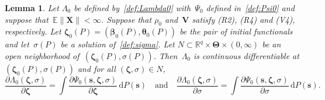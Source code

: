 \documentclass{article}
\numberwithin{equation}{section}
\theoremstyle{plain}
\newtheorem{lemma}{Lemma}
\newcommand{\R}{\mathbb{R}}
\newcommand{\dd}{\mathrm{d}}
\newcommand{\bbeta}{\bm\beta}
\newcommand{\btheta}{\bm\theta}
\newcommand{\bTheta}{\bm\Theta}
\newcommand{\bzeta}{\bm\zeta}
\newcommand{\bs}{\mathbf{s}}
\newcommand{\bX}{\mathbf{X}}
\newcommand{\bV}{\mathbf{V}}
\newcommand{\E}{\mathbb{E}}
\begin{document}
\begin{lemma}
\label{lem:change order int diff Lambda0}
Let $\Lambda_0$ be defined by~\eqref{def:Lambda0} with~$\Psi_0$ defined in~\eqref{def:Psi0}
and suppose that~$\E\|\bX\|<\infty$.
Suppose that $\rho_0$ and~$\bV$ satisfy (R2), (R4) and (V4), respectively.
Let $\bzeta_0(P)=(\bbeta_0(P),\btheta_0(P))$ be the pair of initial functionals
and let~$\sigma(P)$ be a solution of~\eqref{def:sigma}.
Let $N\subset \R^q\times\bTheta\times(0,\infty)$ be an open neighborhood of~$(\bzeta_0(P),\sigma(P))$.
Then~$\Lambda_0$ is continuous differentiable at $(\bzeta_0(P),\sigma(P))$ and
for all $(\bzeta,\sigma)\in N$,
\[
\frac{\partial\Lambda_0(\bzeta,\sigma)}{\partial \bzeta}
=
\int
\frac{\partial\Psi_0(\bs,\bzeta,\sigma)}{\partial \bzeta}\,\dd P(\bs)
\quad\text{and}\quad
\frac{\partial\Lambda_0(\bzeta,\sigma)}{\partial \sigma}
=
\int
\frac{\partial\Psi_0(\bs,\bzeta,\sigma)}{\partial \sigma}\,\dd P(\bs).
\]
\end{lemma}
\end{document}
